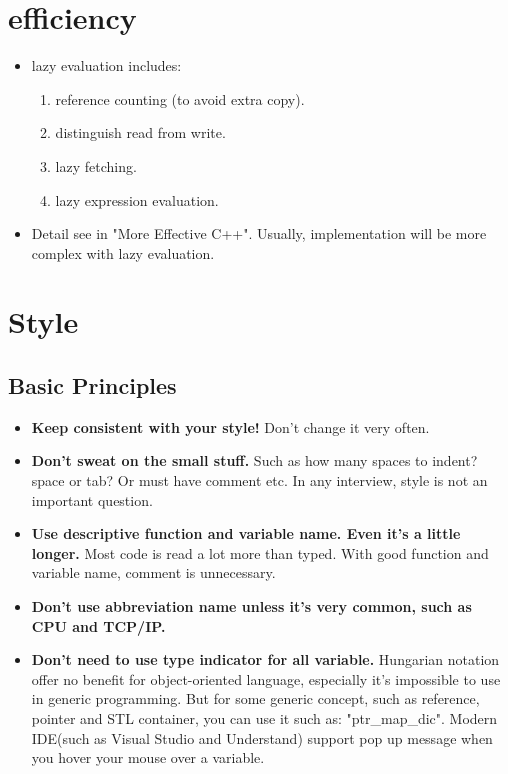 \documentclass[a4paper,11pt,twoside]{book}
\begin{document}
\section{efficiency}
\begin{itemize}
	\item  lazy evaluation includes:
	\begin{enumerate}
		\item reference counting (to avoid extra copy).
		\item distinguish read from write.
		\item lazy fetching.
		\item lazy expression evaluation.
	\end{enumerate}
	\item Detail see in "More Effective C++". Usually, implementation will be  more complex with lazy evaluation.
\end{itemize}



\section{Style}
\subsection{Basic Principles}
\begin{itemize}
	\item \textbf{Keep consistent with your style!} Don't change it very often.
	
	\item \textbf{Don't sweat on the small stuff.} Such as how many spaces to indent? space or tab? Or must have comment etc. In any interview, style is not an important question.
	
	\item \textbf{Use descriptive function and variable name. Even it's a little longer.} Most code is read a lot more than typed. With good function and variable name, comment is unnecessary.
	
	\item \textbf{Don't use abbreviation name unless it's very common, such as CPU and TCP/IP.}
	
	\item \textbf{Don't need to use type indicator for all variable.} Hungarian notation offer no benefit for object-oriented language, especially it's impossible to use in generic programming. But for some generic concept, such as reference, pointer and STL container, you can use it such as: "ptr\_map\_dic". Modern IDE(such as Visual Studio and Understand) support pop up message when you hover your mouse over a variable.
\end{itemize}
\end{document}

